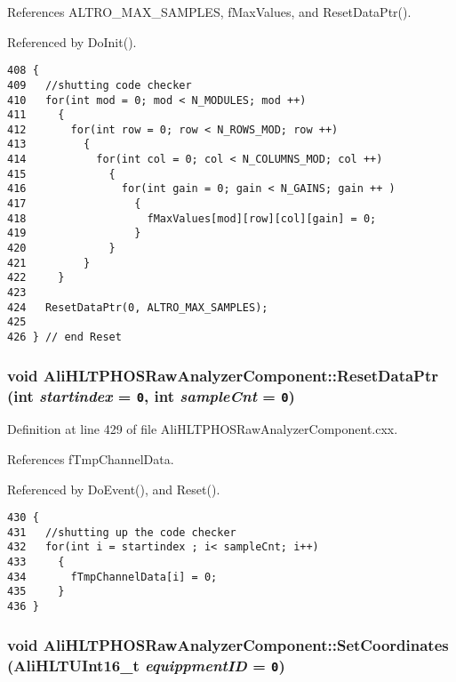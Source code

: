 References ALTRO\_\-MAX\_\-SAMPLES, f\-Max\-Values, and Reset\-Data\-Ptr().

Referenced by Do\-Init().

\footnotesize\begin{verbatim}408 {
409   //shutting code checker
410   for(int mod = 0; mod < N_MODULES; mod ++)
411     {
412       for(int row = 0; row < N_ROWS_MOD; row ++)
413         {
414           for(int col = 0; col < N_COLUMNS_MOD; col ++)
415             {
416               for(int gain = 0; gain < N_GAINS; gain ++ )
417                 {
418                   fMaxValues[mod][row][col][gain] = 0;
419                 }
420             }
421         }
422     }
423 
424   ResetDataPtr(0, ALTRO_MAX_SAMPLES);
425 
426 } // end Reset
\end{verbatim}\normalsize 


\subsubsection{\setlength{\rightskip}{0pt plus 5cm}void Ali\-HLTPHOSRaw\-Analyzer\-Component::Reset\-Data\-Ptr (int {\em startindex} = {\tt 0}, int {\em sample\-Cnt} = {\tt 0})\hspace{0.3cm}{\tt  [private]}}\label{classAliHLTPHOSRawAnalyzerComponent_d2}




Definition at line 429 of file Ali\-HLTPHOSRaw\-Analyzer\-Component.cxx.

References f\-Tmp\-Channel\-Data.

Referenced by Do\-Event(), and Reset().

\footnotesize\begin{verbatim}430 {
431   //shutting up the code checker
432   for(int i = startindex ; i< sampleCnt; i++)
433     {
434       fTmpChannelData[i] = 0;
435     }
436 }
\end{verbatim}\normalsize 


\subsubsection{\setlength{\rightskip}{0pt plus 5cm}void Ali\-HLTPHOSRaw\-Analyzer\-Component::Set\-Coordinates ({\bf Ali\-HLTUInt16\_\-t} {\em equippment\-ID} = {\tt 0})}\label{classAliHLTPHOSRawAnalyzerComponent_a11}




